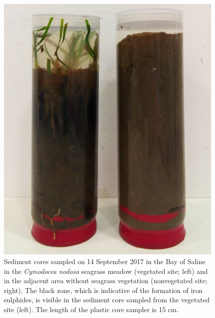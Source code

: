 \documentclass[
  12 pt,
]{book}
\begin{document}
\begin{figure}[ht]

{\centering \includegraphics[width=0.55\linewidth]{figures/sediment-cores-2017-09-14} 

}

\caption{Sediment cores sampled on 14 September 2017 in the Bay of Saline in the \emph{Cymodocea nodosa} seagrass meadow (vegetated site; left) and in the adjacent area without seagrass vegetation (nonvegetated site; right). The black zone, which is indicative of the formation of iron sulphides, is visible in the sediment core sampled from the vegetated site (left). The length of the plastic core sampler is 15 \si{\cm}.}\label{fig:sediment-cores-2017-09-14}
\end{figure}
\end{document}
